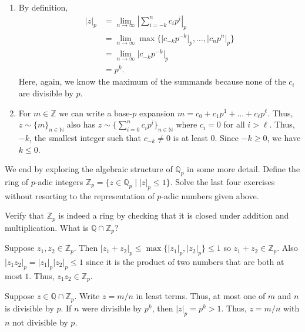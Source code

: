 \documentclass[12 pt, letterpaper]{hmcpset}
\begin{document}
\begin{solution}
	\begin{enumerate}
		\item By definition,
			\begin{align*}
				\lvert z \rvert_{p} & = \lim_{n \to \infty} \left \lvert \sum_{i = -k}^{n} c_{i} p^{i} \right \rvert_{p} \\
						    & = \lim_{n \to \infty} \max \{ \lvert c_{-k} p^{-k} \rvert_{p}, \dots, \lvert c_{n} p^{n} \rvert_{p} \} \\
						    & = \lim_{n \to \infty} \lvert c_{-k} p^{-k} \rvert_{p} \\
						    & = p^{k}.
			\end{align*}
			Here, again, we know the maximum of the summands because none of the $c_{i}$ are divisible by $p$.

		\item For $m \in \mathbb{Z}$ we can write a base-$p$ expansion $m = c_{0} + c_{1} p^{1} + \dots + c_{\ell} p^{\ell}$. Thus, $z \sim \{ m \}_{n \in \mathbb{N}}$ also has $z \sim \{ \sum_{i = 0}^{n} c_{i} p^{i} \}_{n \in \mathbb{N}}$ where $c_{i} = 0$ for all $i > \ell$. Thus, $-k$, the smallest integer such that $c_{-k} \neq 0$ is at least $0$. Since $-k \ge 0$, we have $k \le 0$.
	\end{enumerate}
\end{solution}

\pagebreak

We end by exploring the algebraic structure of $\mathbb{Q}_{p}$ in some more detail. Define the ring of $p$-adic integers $\mathbb{Z}_{p} = \{ z \in \mathbb{Q}_{p} \mid \lvert z \rvert_{p} \le 1 \}$. Solve the last four exercises without resorting to the representation of $p$-adic numbers given above.

\begin{problem}[(5)]
	Verify that $\mathbb{Z}_{p}$ is indeed a ring by checking that it is closed under addition and multiplication. What is $\mathbb{Q} \cap \mathbb{Z}_{p}$?
\end{problem}

\begin{solution}
	Suppose $z_{1}, z_{2} \in \mathbb{Z}_{p}$. Then $\lvert z_{1} + z_{2} \rvert_{p} \le \max \{ \lvert z_{1} \rvert_{p}, \lvert z_{2} \rvert_{p} \} \le 1$ so $z_{1} + z_{2} \in \mathbb{Z}_{p}$. Also $\lvert z_{1} z_{2} \rvert_{p} = \lvert z_{1} \rvert_{p} \lvert z_{2} \rvert_{p} \le 1$ since it is the product of two numbers that are both at most $1$. Thus, $z_{1} z_{2} \in \mathbb{Z}_{p}$.

	Suppose $z \in \mathbb{Q} \cap \mathbb{Z}_{p}$. Write $z = m / n$ in least terms. Thus, at most one of $m$ and $n$ is divisible by $p$. If $n$ were divisible by $p^{k}$, then $\lvert z \rvert_{p} = p^{k} > 1$. Thus, $z = m / n$ with $n$ not divisible by $p$.
\end{solution}
\end{document}
